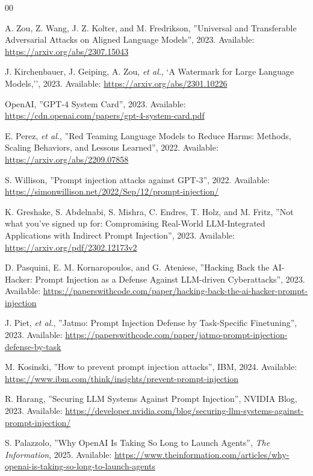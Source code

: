 \documentclass[manuscript,screen,review]{acmart}
\begin{document}


\begin{thebibliography}{00}

 A. Zou, Z. Wang, J. Z. Kolter, and M. Fredrikson, ''Universal and Transferable Adversarial Attacks on Aligned Language Models'', 2023. Available: \url{https://arxiv.org/abs/2307.15043}

 J. Kirchenbauer, J. Geiping, A. Zou, \textit{et al.}, `A Watermark for Large Language Models,'', 2023. Available: \url{https://arxiv.org/abs/2301.10226}

 OpenAI, ''GPT-4 System Card'', 2023. Available: \url{https://cdn.openai.com/papers/gpt-4-system-card.pdf}

 E. Perez, \textit{et al.}, ''Red Teaming Language Models to Reduce Harms: Methods, Scaling Behaviors, and Lessons Learned'', 2022. Available: \url{https://arxiv.org/abs/2209.07858}

 S. Willison, ''Prompt injection attacks against GPT-3'', 2022. Available: \url{https://simonwillison.net/2022/Sep/12/prompt-injection/}

 K. Greshake, S. Abdelnabi, S. Mishra, C. Endres, T. Holz, and M. Fritz, ''Not what you've signed up for: Compromising Real-World LLM-Integrated Applications with Indirect Prompt Injection'', 2023. Available: \url{https://arxiv.org/pdf/2302.12173v2}

 D. Pasquini, E. M. Kornaropoulos, and G. Ateniese, ''Hacking Back the AI-Hacker: Prompt Injection as a Defense Against LLM-driven Cyberattacks'', 2023. Available: \url{https://paperswithcode.com/paper/hacking-back-the-ai-hacker-prompt-injection}

 J. Piet, \textit{et al.}, ''Jatmo: Prompt Injection Defense by Task-Specific Finetuning'', 2023. Available: \url{https://paperswithcode.com/paper/jatmo-prompt-injection-defense-by-task}

 M. Kosinski, ''How to prevent prompt injection attacks'', IBM, 2024. Available: \url{https://www.ibm.com/think/insights/prevent-prompt-injection}

 R. Harang, ''Securing LLM Systems Against Prompt Injection'', NVIDIA Blog, 2023. Available: \url{https://developer.nvidia.com/blog/securing-llm-systems-against-prompt-injection/}

 S. Palazzolo, ''Why OpenAI Is Taking So Long to Launch Agents'', \textit{The Information}, 2025. Available: \url{https://www.theinformation.com/articles/why-openai-is-taking-so-long-to-launch-agents}


\end{thebibliography}
\end{document}
